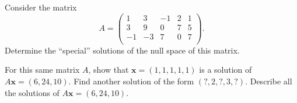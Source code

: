 \documentclass[minion]{homework}
\newcommand{\vx}{\mathbf{x}}
\begin{document}
\begin{aproblems}
\aproblem
Consider the matrix
\[
A=\begin{pmatrix} 
   1  & 3&  -1&   2&   1 \\
   3  & 9&   0&   7&   5 \\
  -1  &-3&   7&   0&   7 \\
\end{pmatrix}.
\]
Determine the ``special'' solutions of the null space of this matrix.

\aproblem For this same matrix $A$, show that $\vx=(1,1,1,1,1)$ is a solution of $A\vx = (6,24,10)$.
Find another solution of the form $(?,2,?,3,?)$.  Describe
all the solutions of $A\vx=(6,24,10)$.

\end{aproblems}
\end{document}
